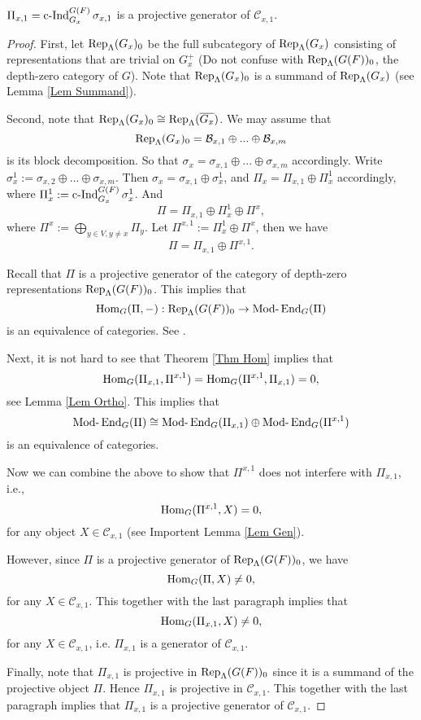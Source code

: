 		\begin{theorem}
			$\Pi_{x,1}=\operatorname{\operatorname{c-Ind}}_{G_x}^{G(F)}\sigma_{x,1}$ is a projective generator of $\mathcal{C}_{x,1}$.
		\end{theorem}
		
		\begin{proof}
			First, let $\operatorname{\operatorname{Rep}}_{\Lambda}(G_x)_0$ be the full subcategory of $\operatorname{\operatorname{Rep}}_{\Lambda}(G_x)$ consisting of representations that are trivial on $G_x^+$ (Do not confuse with $\operatorname{\operatorname{Rep}}_{\Lambda}(G(F))_0$, the depth-zero category of $G$). Note that $\operatorname{\operatorname{Rep}}_{\Lambda}(G_x)_0$ is a summand of $\operatorname{\operatorname{Rep}}_{\Lambda}(G_x)$ (see Lemma \ref{Lem Summand}).
			
			Second, note that $\operatorname{\operatorname{Rep}}_{\Lambda}(G_x)_0 \cong \operatorname{\operatorname{Rep}}_{\Lambda}(\overline{G_x})$. We may assume that $$\operatorname{\operatorname{Rep}}_{\Lambda}(G_x)_0=\mathcal{B}_{x,1} \oplus ... \oplus \mathcal{B}_{x,m}$$
			is its block decomposition. So that $\sigma_x=\sigma_{x,1}\oplus...\oplus\sigma_{x,m}$ accordingly. Write $\sigma_x^1:=\sigma_{x,2}\oplus...\oplus\sigma_{x,m}$. Then $\sigma_x=\sigma_{x,1} \oplus \sigma_x^1$, and $\Pi_x=\Pi_{x,1} \oplus \Pi_x^1$ accordingly, where $\Pi_x^1:=\operatorname{\operatorname{c-Ind}}_{G_x}^{G(F)}\sigma_x^1$. And
			$$\Pi=\Pi_{x,1}\oplus \Pi_x^1 \oplus \Pi^x,$$
			where $\Pi^x:=\bigoplus_{y \in V, y \neq x}\Pi_y$. Let $\Pi^{x,1}:=\Pi_x^1 \oplus \Pi^x$, then we have
			$$\Pi=\Pi_{x,1} \oplus \Pi^{x,1}.$$
			
			Recall that $\Pi$ is a projective generator of the category of depth-zero representations $\operatorname{\operatorname{Rep}}_{\Lambda}(G(F))_0$. This implies that 
			$$\operatorname{\operatorname{Hom}}_G(\Pi, -): \operatorname{\operatorname{Rep}}_{\Lambda}(G(F))_0 \to \operatorname{Mod-}\operatorname{\operatorname{End}}_G(\Pi)$$
			is an equivalence of categories. See \cite[Lemma 22]{bernsteindraft}.
			
			Next, it is not hard to see that Theorem \ref{Thm Hom} implies that 
			$$\operatorname{\operatorname{Hom}}_G(\Pi_{x,1}, \Pi^{x,1})=\operatorname{\operatorname{Hom}}_G(\Pi^{x,1}, \Pi_{x,1})=0,$$
			see Lemma \ref{Lem Ortho}. This implies that $$\operatorname{Mod-}\operatorname{\operatorname{End}}_G(\Pi) \cong \operatorname{Mod-}\operatorname{\operatorname{End}}_G(\Pi_{x,1}) \oplus \operatorname{Mod-}\operatorname{\operatorname{End}}_G(\Pi^{x,1})$$ is an equivalence of categories.
			
			Now we can combine the above to show that $\Pi^{x,1}$ does not interfere with $\Pi_{x,1}$, i.e.,
			$$\operatorname{\operatorname{Hom}}_G(\Pi^{x,1}, X)=0,$$
			for any object $X \in \mathcal{C}_{x,1}$ (see Importent Lemma \ref{Lem Gen}).
			
			However, since $\Pi$ is a projective generator of $\operatorname{\operatorname{Rep}}_{\Lambda}(G(F))_0$, we have
			$$\operatorname{\operatorname{Hom}}_G(\Pi, X) \neq 0,$$
			for any $X \in \mathcal{C}_{x,1}$. This together with the last paragraph implies that 
			$$\operatorname{\operatorname{Hom}}_G(\Pi_{x,1}, X) \neq 0,$$
			for any $X \in \mathcal{C}_{x,1}$, i.e. $\Pi_{x,1}$ is a generator of $\mathcal{C}_{x,1}$.
			
			Finally, note that $\Pi_{x,1}$ is projective in $\operatorname{\operatorname{Rep}}_{\Lambda}(G(F))_0$ since it is a summand of the projective object $\Pi$. Hence $\Pi_{x,1}$ is projective in $\mathcal{C}_{x,1}$. This together with the last paragraph implies that $\Pi_{x,1}$ is a projective generator of $\mathcal{C}_{x,1}$.
			
			
		\end{proof}
		

